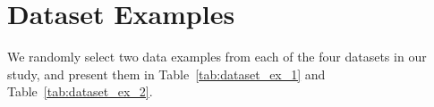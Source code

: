 
\section{Dataset Examples}
\label{appx_data_examples}

We randomly select two data examples from each of the four datasets in our study, and present them in Table~\ref{tab:dataset_ex_1} and Table~\ref{tab:dataset_ex_2}.



